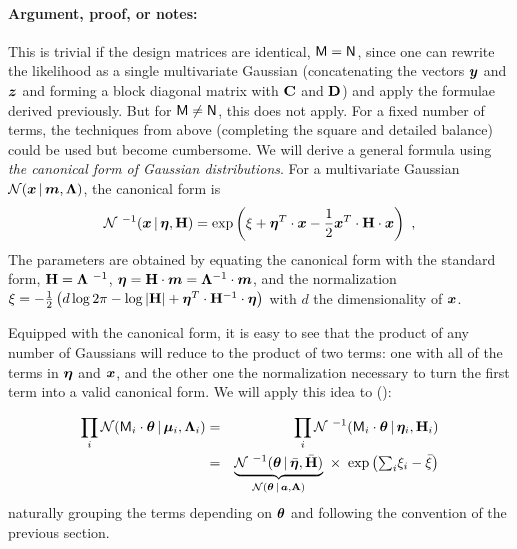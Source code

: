 \paragraph{Argument, proof, or notes:}

This is trivial if the design matrices are identical, $\mathsf{M} = \mathsf{N}$, since one can rewrite the likelihood as a single multivariate Gaussian (concatenating the vectors $\boldsymbol{y}$ and $\boldsymbol{z}$ and forming a block diagonal matrix with $\mathbf{C}$ and $\mathbf{D}$) and apply the formulae derived previously. But for $\mathsf{M} \neq \mathsf{N}$, this does not apply. For a fixed number of terms, the techniques from above (completing the square and detailed balance) could be used but become cumbersome. We will derive a general formula using \textit{the canonical form of Gaussian distributions}.
For a multivariate Gaussian $\mathcal{N}\!\,(\boldsymbol{x}\,|\,\boldsymbol{m},\mathbf{\Lambda})$, the canonical form is
\begin{equation}
\normal^{\ -1}(\vx\given\veta, \tH) = \exp\left(\xi +  \veta^T\cdot\vx - \frac{1}{2}\vx^T \cdot\tH \cdot \vx\right)
~ ,
\end{equation}
The parameters are obtained by equating the canonical form with the standard form, $\tH = \tLambda^{\ -1}$, $\boldsymbol{\eta} = \mathbf{H}\cdot \boldsymbol{m} = \mathbf{\Lambda}^{-1}\cdot \boldsymbol{m}$, and the normalization
$\xi = -\frac{1}{2}\left( d\log 2\pi -\log|\mathbf{H}| + \boldsymbol{\eta}^T \cdot \mathbf{H}^{-1}\cdot \boldsymbol{\eta} \right)$
with $d$ the dimensionality of $\boldsymbol{x}$.

Equipped with the canonical form, it is easy to see that the product of any number of Gaussians will reduce to the product of two terms: one with all of the terms in $\boldsymbol{\eta}$ and $\boldsymbol{x}$, and the other one the normalization necessary to turn the first term into a valid canonical form. We will apply this idea to ():

\begin{eqnarray}
\prod_i \normal( \mM_i\cdot\vtheta \given \vmu_i,\tLambda_i) &=& \prod_i \normal^{\ -1}( \mM_i\cdot\vtheta\given\veta_i, \tH_i) \\
&=&   \underbrace{\normal^{\ -1}(\vtheta\given\bar{\veta}, \bar{\tH})}_{ \normal(\vtheta\given\va,\tA) } \ \times \ \exp\left(\textstyle{\sum_i} \xi_i - \bar{\xi} \right)
\end{eqnarray}
naturally grouping the terms depending on $\boldsymbol{\theta}$ and following the convention of the previous section.

